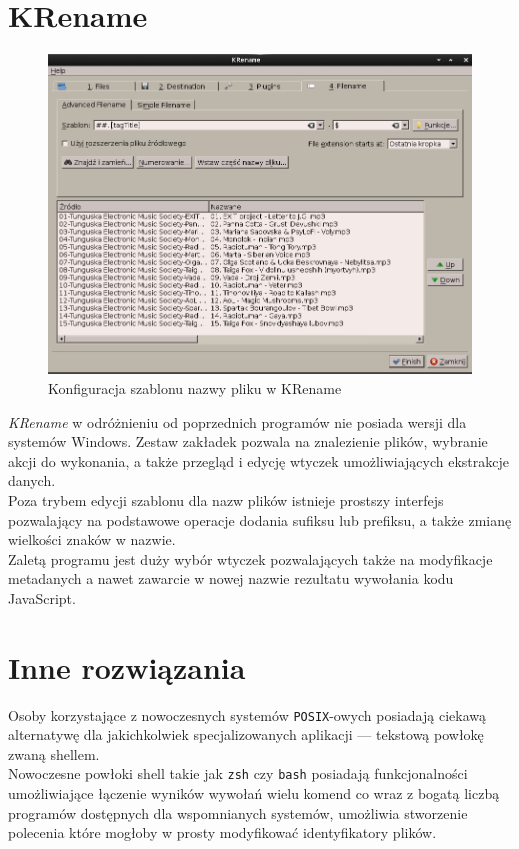 \section{KRename}
\begin{figure}[h]
\begin{center}
\includegraphics[scale=0.55]{img/krename_window.png}
\end{center}
\caption{Konfiguracja szablonu nazwy pliku w KRename}
\end{figure}

\par
\textit{KRename} w odróżnieniu od poprzednich programów nie posiada wersji dla systemów Windows. Zestaw zakładek pozwala na znalezienie plików, wybranie akcji do wykonania, a także przegląd i edycję wtyczek umożliwiających ekstrakcje danych.\\
Poza trybem edycji szablonu dla nazw plików istnieje prostszy interfejs pozwalający na podstawowe operacje dodania sufiksu lub prefiksu, a także zmianę wielkości znaków w nazwie.\\
Zaletą programu jest duży wybór wtyczek pozwalających także na modyfikacje metadanych a nawet zawarcie w nowej nazwie rezultatu wywołania kodu JavaScript.

\section{Inne rozwiązania}
\par
Osoby korzystające z nowoczesnych systemów \texttt{POSIX}-owych posiadają ciekawą alternatywę dla jakichkolwiek specjalizowanych aplikacji --- tekstową powłokę zwaną shellem.\\
Nowoczesne powłoki shell takie jak \texttt{zsh} czy \texttt{bash} posiadają funkcjonalności umożliwiające łączenie wyników wywołań wielu komend co wraz z bogatą liczbą programów dostępnych dla wspomnianych systemów, umożliwia stworzenie polecenia które mogłoby w prosty modyfikować identyfikatory plików.\\


